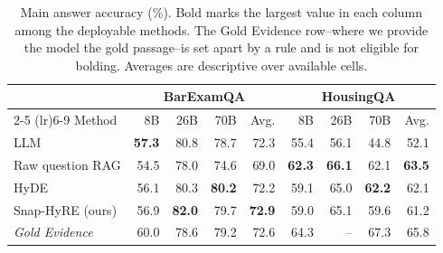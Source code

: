 \begin{table}[t]
\centering
\caption{Main answer accuracy (\%). Bold marks the largest value in each column among the deployable methods. The Gold Evidence row--where we provide the model the gold passage--is set apart by a rule and is not eligible for bolding. Averages are descriptive over available cells.}
\label{tab:answer_matrix}
\footnotesize
\setlength{\tabcolsep}{4pt}
\begin{tabular}{lrrrrrrrr}
\toprule
& \multicolumn{4}{c}{BarExamQA} & \multicolumn{4}{c}{HousingQA} \\
\cmidrule(lr){2-5} \cmidrule(lr){6-9}
Method & 8B & 26B & 70B & Avg. & 8B & 26B & 70B & Avg. \\
\midrule
LLM & \textbf{57.3} & 80.8 & 78.7 & 72.3 & 55.4 & 56.1 & 44.8 & 52.1 \\
Raw question RAG & 54.5 & 78.0 & 74.6 & 69.0 & \textbf{62.3} & \textbf{66.1} & 62.1 & \textbf{63.5} \\
HyDE & 56.1 & 80.3 & \textbf{80.2} & 72.2 & 59.1 & 65.0 & \textbf{62.2} & 62.1 \\
Snap-HyRE (ours) & 56.9 & \textbf{82.0} & 79.7 & \textbf{72.9} & 59.0 & 65.1 & 59.6 & 61.2 \\
\midrule
\textit{Gold Evidence} & 60.0 & 78.6 & 79.2 & 72.6 & 64.3 & -- & 67.3 & 65.8 \\
\bottomrule
\end{tabular}
\end{table}
